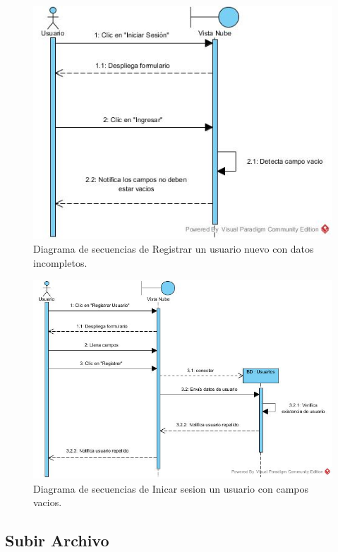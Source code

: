 \begin{figure}[htbp!]
		\centering
			\includegraphics[width=1\textwidth]{images/Iniciar_trayectoria_b}
		\caption{Diagrama de secuencias de Registrar un usuario nuevo con datos incompletos.}
\end{figure}

\begin{figure}[htbp!]
		\centering
			\includegraphics[width=1\textwidth]{images/Registrar_trayectoria_c}
		\caption{Diagrama de secuencias de  Inicar sesion un usuario con campos vacios.}
\end{figure} 
\newpage

\subsection{Subir Archivo}

